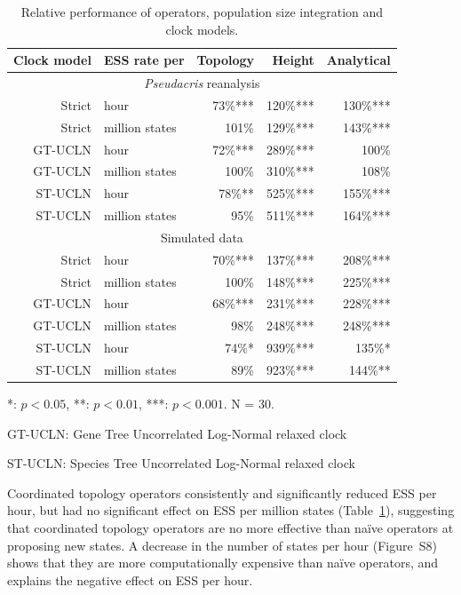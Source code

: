 \documentclass[12pt]{article}
\begin{document}
\begin{table}[htb!]
\caption{Relative performance of operators, population size integration and clock models.}
\label{tab:convergenceLM}
\begin{threeparttable}
\begin{tabular*}{\textwidth}{@{\extracolsep{\fill}}rlrrr@{}}
\hline
Clock model & ESS rate per & Topology & Height & Analytical\tabularnewline
\hline
\multicolumn{5}{c}{\textit{Pseudacris} reanalysis}\tabularnewline
\hline
Strict & hour & 73\%{***} & 120\%{***} & 130\%{***}\tabularnewline
Strict & million states & 101\%\hphantom{***} & 129\%{***} & 143\%{***}\tabularnewline
GT-UCLN & hour & 72\%{***} & 289\%{***} & 100\%\hphantom{***}\tabularnewline
GT-UCLN & million states & 100\%\hphantom{***} & 310\%{***} & 108\%\hphantom{***}\tabularnewline
ST-UCLN & hour & 78\%{**}\hphantom{*} & 525\%{***} & 155\%{***}\tabularnewline
ST-UCLN & million states & 95\%\hphantom{***} & 511\%{***} & 164\%{***}\tabularnewline
\hline
\multicolumn{5}{c}{Simulated data}\tabularnewline
\hline
Strict & hour & 70\%{***} & 137\%{***} & 208\%{***}\tabularnewline
Strict & million states & 100\%\hphantom{***} & 148\%{***} & 225\%{***}\tabularnewline
GT-UCLN & hour & 68\%{***} & 231\%{***} & 228\%{***}\tabularnewline
GT-UCLN & million states & 98\%\hphantom{***} & 248\%{***} & 248\%{***}\tabularnewline
ST-UCLN & hour & 74\%{*}\hphantom{**} & 939\%{***} & 135\%{*}\hphantom{**}\tabularnewline
ST-UCLN & million states & 89\%\hphantom{***} & 923\%{***} & 144\%{**}\hphantom{*}\tabularnewline
\hline
\end{tabular*}
\begin{tablenotes}
\item {*}: $p < 0.05$, {**}: $p < 0.01$, {***}: $p < 0.001$. N = 30.
\item GT-UCLN: Gene Tree Uncorrelated Log-Normal relaxed clock
\item ST-UCLN: Species Tree Uncorrelated Log-Normal relaxed clock
\end{tablenotes}
\end{threeparttable}
\end{table}

Coordinated topology operators consistently and significantly reduced ESS
per hour, but had no significant effect on ESS per million states
(Table~\ref{tab:convergenceLM}), suggesting that coordinated topology
operators are no more effective than na\"ive operators at proposing new
states. A decrease in the number of states per hour (Figure~S8) shows that
they are more computationally expensive than na\"ive operators, and explains
the negative effect on ESS per hour.
\end{document}
